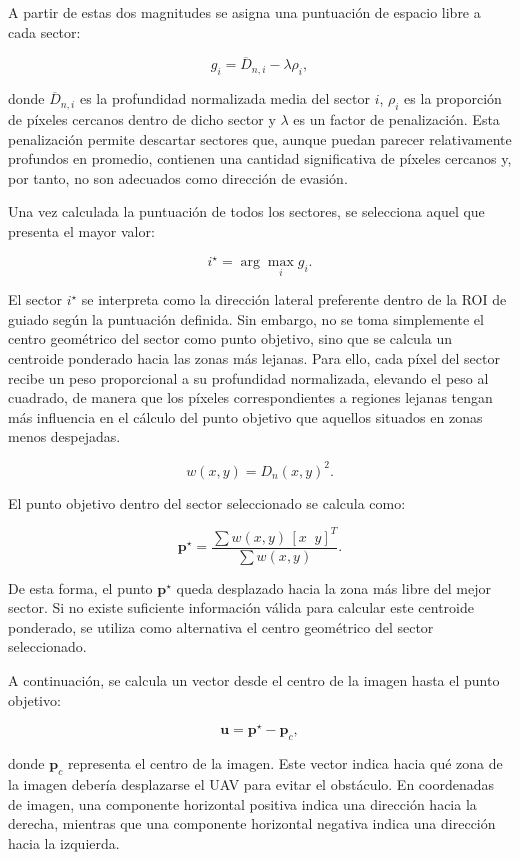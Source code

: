 A partir de estas dos magnitudes se asigna una puntuación de espacio libre a cada sector:

\[
g_i = \overline{D}_{n,i} - \lambda \rho_i,
\]

donde \(\overline{D}_{n,i}\) es la profundidad normalizada media del sector \(i\), \(\rho_i\) es la proporción de píxeles 
cercanos dentro de dicho sector y \(\lambda\) es un factor de penalización. Esta penalización permite descartar sectores 
que, aunque puedan parecer relativamente profundos en promedio, contienen una cantidad significativa de píxeles cercanos 
y, por tanto, no son adecuados como dirección de evasión.

Una vez calculada la puntuación de todos los sectores, se selecciona aquel que presenta el mayor valor:

\[
i^\star = \arg\max_i g_i.
\]

El sector \(i^\star\) se interpreta como la dirección lateral preferente dentro de la ROI de guiado según la puntuación 
definida. Sin embargo, no se toma simplemente el centro geométrico del sector como punto objetivo, sino que se calcula un 
centroide ponderado hacia las zonas más lejanas. Para ello, cada píxel del sector recibe un peso proporcional a su 
profundidad normalizada, elevando el peso al cuadrado, de manera que los píxeles correspondientes a regiones lejanas 
tengan más influencia en el cálculo del punto objetivo que aquellos situados en zonas menos despejadas.

\[
w(x,y)=D_n(x,y)^2.
\]

El punto objetivo dentro del sector seleccionado se calcula como:

\[
\mathbf{p}^\star =
\frac{\sum w(x,y)\,[x\;\;y]^T}{\sum w(x,y)}.
\]

De esta forma, el punto \(\mathbf{p}^\star\) queda desplazado hacia la zona más libre del mejor sector. Si no existe 
suficiente información válida para calcular este centroide ponderado, se utiliza como alternativa el centro geométrico 
del sector seleccionado.

A continuación, se calcula un vector desde el centro de la imagen hasta el punto objetivo:

\[
\mathbf{u} = \mathbf{p}^\star - \mathbf{p}_c,
\]

donde \(\mathbf{p}_c\) representa el centro de la imagen. Este vector indica hacia qué zona de la imagen debería 
desplazarse el UAV para evitar el obstáculo. En coordenadas de imagen, una componente horizontal positiva indica una 
dirección hacia la derecha, mientras que una componente horizontal negativa indica una dirección hacia la izquierda.

